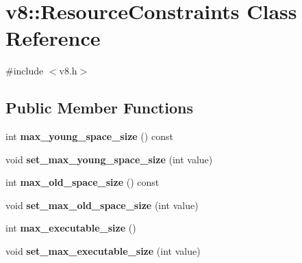 \hypertarget{classv8_1_1_resource_constraints}{}\section{v8\+:\+:Resource\+Constraints Class Reference}
\label{classv8_1_1_resource_constraints}


{\ttfamily \#include $<$v8.\+h$>$}

\subsection*{Public Member Functions}
\begin{DoxyCompactItemize}
\item 
\hypertarget{classv8_1_1_resource_constraints_a0029d59f46980f02651792eac83bd432}{}int {\bfseries max\+\_\+young\+\_\+space\+\_\+size} () const \label{classv8_1_1_resource_constraints_a0029d59f46980f02651792eac83bd432}

\item 
\hypertarget{classv8_1_1_resource_constraints_abe82f0ef2376266257d3a94b9d4af265}{}void {\bfseries set\+\_\+max\+\_\+young\+\_\+space\+\_\+size} (int value)\label{classv8_1_1_resource_constraints_abe82f0ef2376266257d3a94b9d4af265}

\item 
\hypertarget{classv8_1_1_resource_constraints_a72840efdbcfc7bb287c6aea38d0b07b9}{}int {\bfseries max\+\_\+old\+\_\+space\+\_\+size} () const \label{classv8_1_1_resource_constraints_a72840efdbcfc7bb287c6aea38d0b07b9}

\item 
\hypertarget{classv8_1_1_resource_constraints_aa764be7c76b4baa3fce7a54c3777b5e9}{}void {\bfseries set\+\_\+max\+\_\+old\+\_\+space\+\_\+size} (int value)\label{classv8_1_1_resource_constraints_aa764be7c76b4baa3fce7a54c3777b5e9}

\item 
\hypertarget{classv8_1_1_resource_constraints_a1e7352d13eb11d2381c221c0af410504}{}int {\bfseries max\+\_\+executable\+\_\+size} ()\label{classv8_1_1_resource_constraints_a1e7352d13eb11d2381c221c0af410504}

\item 
\hypertarget{classv8_1_1_resource_constraints_a37d1b38672e9844c567823a119dcd557}{}void {\bfseries set\+\_\+max\+\_\+executable\+\_\+size} (int value)\label{classv8_1_1_resource_constraints_a37d1b38672e9844c567823a119dcd557}


\end{DoxyCompactItemize}
